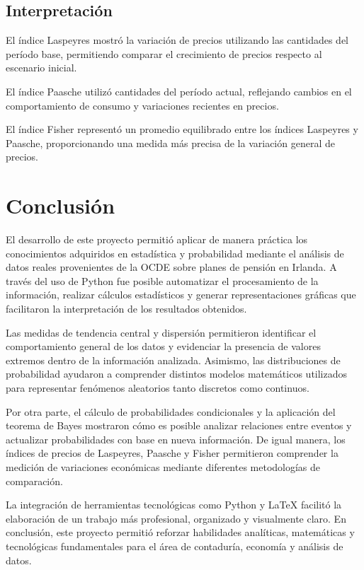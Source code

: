 \documentclass[12pt]{article}
\begin{document}
\subsection{Interpretación}

El índice Laspeyres mostró la variación de precios utilizando las cantidades del período base, permitiendo comparar el crecimiento de precios respecto al escenario inicial.

El índice Paasche utilizó cantidades del período actual, reflejando cambios en el comportamiento de consumo y variaciones recientes en precios.

El índice Fisher representó un promedio equilibrado entre los índices Laspeyres y Paasche, proporcionando una medida más precisa de la variación general de precios.


\section{Conclusión}

El desarrollo de este proyecto permitió aplicar de manera práctica los conocimientos adquiridos en estadística y probabilidad mediante el análisis de datos reales provenientes de la OCDE sobre planes de pensión en Irlanda. A través del uso de Python fue posible automatizar el procesamiento de la información, realizar cálculos estadísticos y generar representaciones gráficas que facilitaron la interpretación de los resultados obtenidos.

Las medidas de tendencia central y dispersión permitieron identificar el comportamiento general de los datos y evidenciar la presencia de valores extremos dentro de la información analizada. Asimismo, las distribuciones de probabilidad ayudaron a comprender distintos modelos matemáticos utilizados para representar fenómenos aleatorios tanto discretos como continuos.

Por otra parte, el cálculo de probabilidades condicionales y la aplicación del teorema de Bayes mostraron cómo es posible analizar relaciones entre eventos y actualizar probabilidades con base en nueva información. De igual manera, los índices de precios de Laspeyres, Paasche y Fisher permitieron comprender la medición de variaciones económicas mediante diferentes metodologías de comparación.

La integración de herramientas tecnológicas como Python y LaTeX facilitó la elaboración de un trabajo más profesional, organizado y visualmente claro. En conclusión, este proyecto permitió reforzar habilidades analíticas, matemáticas y tecnológicas fundamentales para el área de contaduría, economía y análisis de datos.
\end{document}
